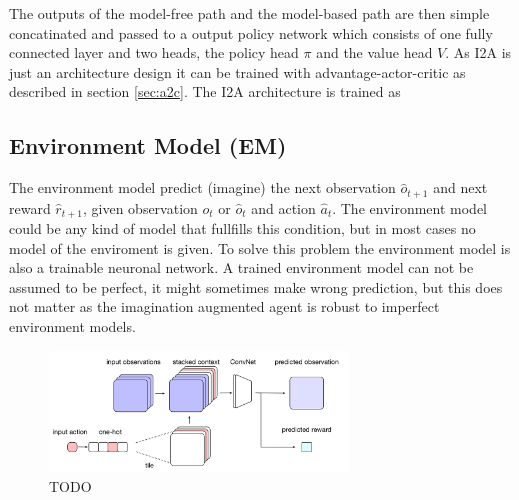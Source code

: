 The outputs of the model-free path and the model-based path are then simple concatinated and passed to a output policy network which consists of one fully connected layer and two heads, the policy head $\pi$ and the value head $V$.
As I2A is just an architecture design it can be trained with advantage-actor-critic as described in section \ref{sec:a2c}.
The I2A architecture is trained as 

 
 


 

\subsection{Environment Model (EM)}
\label{sec:env_model}

The environment model predict (imagine) the next observation $\hat{o}_{t+1}$ and next reward $\hat{r}_{t+1}$, given observation $o_t$ or $\hat{o}_t$ and action $\hat{a}_t$.
The environment model could be any kind of model that fullfills this condition, but in most cases no model of the enviroment is given.
To solve this problem the environment model is also a trainable neuronal network.
A trained environment model can not be assumed to be perfect, it might sometimes make wrong prediction, but this does not matter as the imagination augmented agent is robust to imperfect environment models.

   
\begin{figure}[H] 
  \centering 
   
  \includegraphics[width=300px]{./Images/environment_model_architecture.png}
  \caption{TODO} 
  \label{fig:environment_model_architecture} 
\end{figure} 

